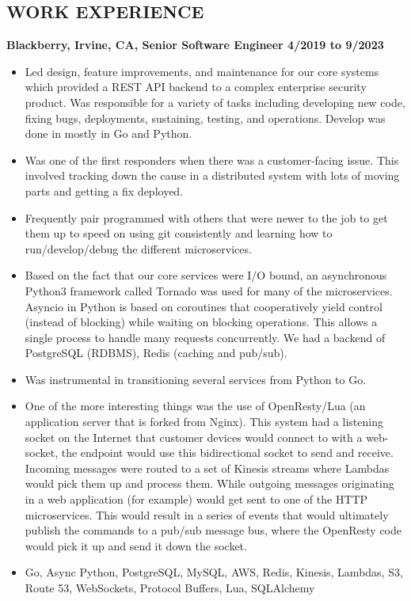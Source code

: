 \documentclass{res}
\begin{document}
\begin{resume}
\section{WORK EXPERIENCE}
  {\large \bf Blackberry, Irvine, CA, Senior Software Engineer \hfill 4/2019 to 9/2023}
  \begin{itemize}
  \item
    Led design, feature improvements, and maintenance for our core
    systems which provided a REST API backend to a complex enterprise
    security product.  Was responsible for a variety of tasks including
    developing new code, fixing bugs, deployments, sustaining, testing,
    and operations.  Develop was done in mostly in Go and Python.
  \item
    Was one of the first responders when there was a customer-facing
    issue.  This involved tracking down the cause in a distributed system
    with lots of moving parts and getting a fix deployed.
  \item
    Frequently pair programmed with others that were newer to the job
    to get them up to speed on using git consistently and learning how
    to run/develop/debug the different microservices.
  \item
    Based on the fact that our core services were I/O bound, an
    asynchronous Python3 framework called Tornado was used for many of
    the microservices. Asyncio in Python is based on coroutines that
    cooperatively yield control (instead of blocking) while waiting on
    blocking operations. This allows a single process to handle many
    requests concurrently.  We had a backend of PostgreSQL (RDBMS),
    Redis (caching and pub/sub).
  \item
    Was instrumental in transitioning several services from Python to Go.
  \item
    One of the more interesting things was the use of OpenResty/Lua (an
    application server that is forked from Nginx).  This system had a
    listening socket on the Internet that customer devices would connect
    to with a web-socket, the endpoint would use this bidirectional
    socket to send and receive.  Incoming messages were routed to a set
    of Kinesis streams where Lambdas would pick them up and process them.
    While outgoing messages originating in a web application (for example)
    would get sent to one of  the HTTP microservices.  This would result
    in a series of events that would ultimately publish the commands
    to a pub/sub message bus, where the OpenResty code would pick it up
    and send it down the socket.
  \item
    Go, Async Python, PostgreSQL, MySQL, AWS, Redis, Kinesis,
    Lambdas, S3, Route 53, WebSockets, Protocol Buffers, Lua, SQLAlchemy
  \end{itemize}


\end{resume}
\end{document}
